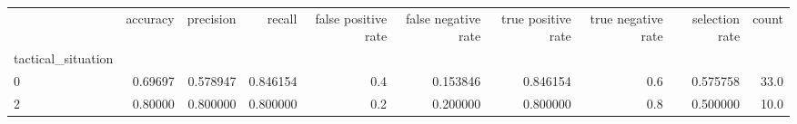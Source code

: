 \begin{tabular}{lrrrrrrrrr}
\toprule
{} &  accuracy &  precision &    recall &  false positive rate &  false negative rate &  true positive rate &  true negative rate &  selection rate &  count \\
tactical\_situation &           &            &           &                      &                      &                     &                     &                 &        \\
\midrule
0                  &   0.69697 &   0.578947 &  0.846154 &                  0.4 &             0.153846 &            0.846154 &                 0.6 &        0.575758 &   33.0 \\
2                  &   0.80000 &   0.800000 &  0.800000 &                  0.2 &             0.200000 &            0.800000 &                 0.8 &        0.500000 &   10.0 \\
\bottomrule
\end{tabular}

